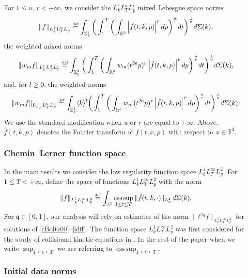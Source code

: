 \documentclass[reqno]{amsart}
\newcommand{\eqdef }{\overset{\mbox{\tiny{def}}}{=}}
\newcommand{\pv}{p}
\def\R{\mathbb R}
\newcommand{\qq}{\mathfrak{q}}
\newcommand{\tqq}{t^{2\qq}}
\newcommand{\tTq}{t^{3\qq}}
\newcommand{\T}{\mathbb{T}}
\newcommand{\Z}{\mathbb{Z}}
\DeclareMathOperator*{\esssup}{ess\,sup}
\theoremstyle{definition}
\numberwithin{equation}{section}
\numberwithin{theorem}{section}
\begin{document}
For $1\le u$, $r< +\infty$, we consider the $L^1_kL^u_TL^r_p$ mixed Lebesgue space norms 
\begin{equation*}
\|f\|_{L^1_kL^u_TL^r_{\pv}}
\eqdef
 \int_{\Z^3_{k}}
\bigg(
\int_{1}^{T}
\bigg(
\int_{\R^3}
\left| \hat{f}(t,k,\pv)\right|^r
d\pv
\bigg)^{\frac{u}{r}} dt
\bigg)^{\frac{1}{u}}
d\Sigma(k),
\end{equation*}
the weighted mixed norms  
\begin{equation*}
\|w_{m}f\|_{L^1_kL^u_TL^r_{\pv}}
\eqdef
 \int_{\Z^3_{k}}
\bigg(
\int_{1}^{T}
\bigg(
\int_{\R^3} w_{m}( \tqq \pv)^r
\left| \hat{f}(t,k,\pv)\right|^r
d\pv
\bigg)^{\frac{u}{r}} dt
\bigg)^{\frac{1}{u}}
d\Sigma(k),
\end{equation*}
and, for \(l\geq 0\), the weighted norms
\begin{equation*}
\|w_{m}f\|_{L^1_{k,l}L^u_TL^r_{\pv}}
\eqdef
 \int_{\Z^3_{k}} \langle k \rangle^l
\bigg(
\int_{1}^{T}
\bigg(
\int_{\R^3} w_{m}( \tqq \pv)^r
\left| \hat{f}(t,k,\pv)\right|^r
d\pv
\bigg)^{\frac{u}{r}} dt
\bigg)^{\frac{1}{u}}
d\Sigma(k).
\end{equation*}
We use the standard modification when $u$ or $r$ are equal to $+\infty$. Above, \(\hat{f}(t,k,p)\) denotes the Fourier transform of $f(t,x,\pv)$ with respect to $x\in \T^3$. 



\subsubsection{Chemin--Lerner function space}

In the main results we consider the low regularity function space \(L^1_kL^{\infty}_TL^2_p\).  For \(1\leq T<+\infty\), define the space of functions \(L^1_kL^{\infty}_TL^2_p\) with the norm 
\begin{equation}\notag 
\|  f\|_{L^1_kL^{\infty}_TL^2_p} \eqdef\int_{\Z^3}\esssup_{1\leq t \leq T}  \|\hat{f}(t,k,\cdot)\|_{L^2_{\pv}} \,d\Sigma (k) .
\end{equation}
For \(\qq\in [0,1]\), our analysis will rely on  estimates of the norm \(\|\tTq f\|_{L^1_kL^{\infty}_TL^2_p} \) for solutions of \eqref{rBoltz00}--\eqref{idff}.  The function space \(L^1_kL^{\infty}_TL^2_p\) was first considered for the study of collisional kinetic equations in \cite{1904.12086}. In the rest of the paper when we write $\sup_{1\leq t \leq T}$ we are referring to  $\esssup_{1\leq t \leq T}$. 


\subsubsection{Initial data norms}
\end{document}
